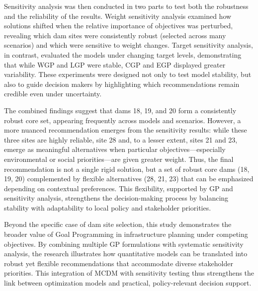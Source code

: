 Sensitivity analysis was then conducted in two parts to test both the robustness and the reliability of the results. Weight sensitivity analysis examined how solutions shifted when the relative importance of objectives was perturbed, revealing which dam sites were consistently robust (selected across many scenarios) and which were sensitive to weight changes. Target sensitivity analysis, in contrast, evaluated the models under changing target levels, demonstrating that while WGP and LGP were stable, CGP and EGP displayed greater variability. These experiments were designed not only to test model stability, but also to guide decision makers by highlighting which recommendations remain credible even under uncertainty.

The combined findings suggest that dams 18, 19,  and 20 form a consistently robust core set, appearing frequently across models and scenarios. However, a more nuanced recommendation emerges from the sensitivity results: while these three sites are highly reliable, site 28 and, to a lesser extent, sites 21 and 23, emerge as meaningful alternatives when particular objectives—especially environmental or social priorities—are given greater weight. Thus, the final recommendation is not a single rigid solution, but a set of robust core dams (18, 19, 20) complemented by flexible alternatives (28, 21, 23) that can be emphasized depending on contextual preferences. This flexibility, supported by GP and sensitivity analysis, strengthens the decision-making process by balancing stability with adaptability to local policy and stakeholder priorities.

Beyond the specific case of dam site selection, this study demonstrates the broader value of Goal Programming in infrastructure planning under competing objectives. By combining multiple GP formulations with systematic sensitivity analysis, the research illustrates how quantitative models can be translated into robust yet flexible recommendations that accommodate diverse stakeholder priorities. This integration of MCDM with sensitivity testing thus strengthens the link between optimization models and practical, policy-relevant decision support.